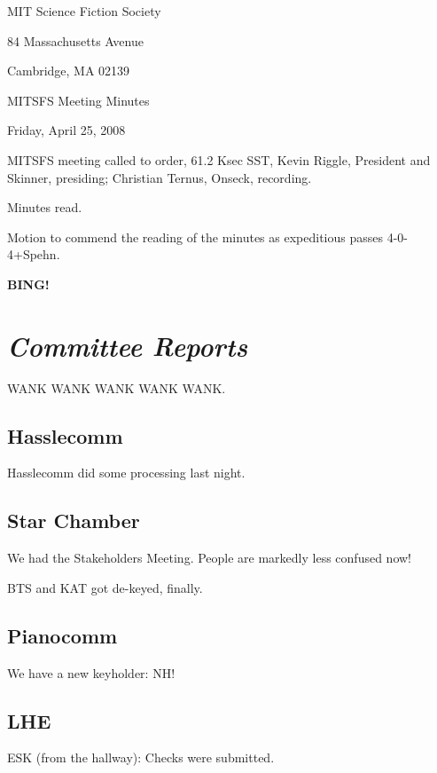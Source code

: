 \documentclass[10pt]{article}
\newcommand{\bing}{{\bf BING!} }
\newcommand{\goto}[1]{\bing \vskip 12pt \section*{{\em{#1}}}}
\begin{document}
\begin{center}

MIT Science Fiction Society

84 Massachusetts Avenue

Cambridge, MA 02139

\vspace{12pt}

MITSFS Meeting Minutes

Friday, April 25, 2008

\end{center}

\vspace{18pt}

\setlength{\parskip}{6pt}

\noindent
MITSFS meeting called to order, 61.2 Ksec SST,
Kevin Riggle, President and Skinner, presiding; Christian Ternus, Onseck, recording.

Minutes read.

Motion to commend the reading of the minutes as expeditious passes 4-0-4+Spehn.

\BING

\goto{Committee Reports}

WANK WANK WANK WANK WANK.

\subsection*{Hasslecomm}

Hasslecomm did some processing last night.

\subsection*{Star Chamber}

We had the Stakeholders Meeting.  People are markedly less confused now!

BTS and KAT got de-keyed, finally.

\subsection*{Pianocomm}

We have a new keyholder: NH!

\subsection*{LHE}

ESK (from the hallway): Checks were submitted.
\end{document}
